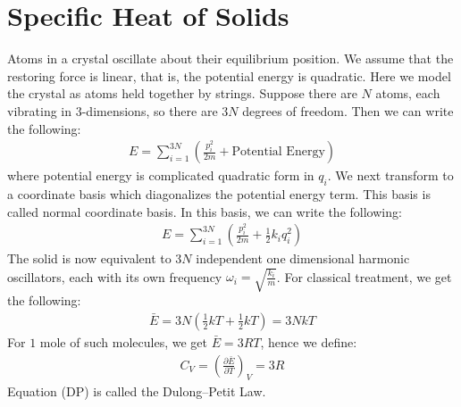 \documentclass[11pt,oneside]{book}
\theoremstyle{break}
\theoremstyle{break}
\begin{document}
\section[Specific Heat of Solids]{\color{red}Specific Heat of Solids\color{black}}
Atoms in a crystal oscillate about their equilibrium position. We assume that the restoring force is linear, that is, the potential energy is quadratic. Here we model the crystal as atoms held together by strings. Suppose there are $N$ atoms, each vibrating in $3$-dimensions, so there are $3N$ degrees of freedom. Then we can write the following:
\begin{align*}
E = \sum_{i=1}^{3N} \left(\frac{p_i^2}{2m} + \text{Potential Energy}\right)
\end{align*}
where potential energy is complicated quadratic form in $q_i$. We next transform to a coordinate basis which diagonalizes the potential energy term. This basis is called normal coordinate basis. In this basis, we can write the following:
\begin{align*}
E = \sum_{i=1}^{3N}\left( \frac{p_i^2}{2m}+\frac{1}{2}k_iq_i^2\right)
\end{align*}
The solid is now equivalent to $3N$ independent one dimensional harmonic oscillators, each with its own frequency $\omega_i = \sqrt{\frac{k_i}{m}}$. For classical treatment, we get the following:
\begin{align*}
\bar{E} = 3N\left(\frac{1}{2}kT + \frac{1}{2}kT\right) = 3NkT
\end{align*}
For $1$ mole of such molecules, we get $\bar{E} = 3RT$, hence we define:
\begin{align*}
C_V = \left(\frac{\partial \bar{E}}{\partial T} \right)_V = 3R \tag{DP}
\end{align*}
Equation (DP) is called the Dulong–Petit Law.\\
\end{document}
